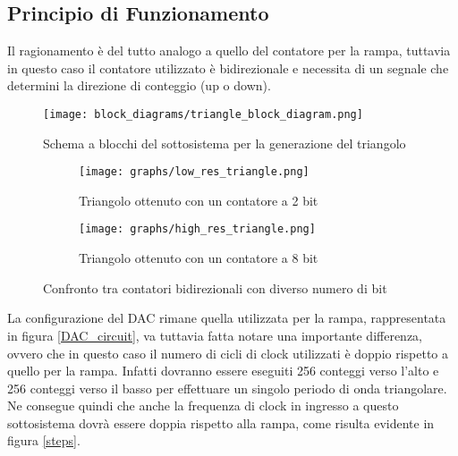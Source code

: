 
\subsection*{Principio di Funzionamento}


Il ragionamento è del tutto analogo a quello del contatore per la rampa, tuttavia in questo
caso il contatore utilizzato è bidirezionale e necessita di un segnale che determini la
direzione di conteggio (up o down).
\medskip

\begin{figure}[ht]
    \centering
    \texttt{[image: block\_diagrams/triangle\_block\_diagram.png]}
    \caption{Schema a blocchi del sottosistema per la generazione del triangolo}
    \label{triangle_block_diagram}
\end{figure}

\begin{figure}[ht]
    \centering

    \begin{subfigure}{.5\textwidth}
        \centering
        \texttt{[image: graphs/low\_res\_triangle.png]}
        \caption{Triangolo ottenuto con un contatore a 2 bit}
        \label{low_res_triangle}
    \end{subfigure}%
    \begin{subfigure}{.5\textwidth}
        \centering
        \texttt{[image: graphs/high\_res\_triangle.png]}
        \caption{Triangolo ottenuto con un contatore a 8 bit}
        \label{high_res_triangle}
    \end{subfigure}

    \caption{Confronto tra contatori bidirezionali con diverso numero di bit}
    \label{triangles}
\end{figure}

La configurazione del DAC rimane quella utilizzata per la rampa, rappresentata in figura
\ref{DAC_circuit}, va tuttavia fatta notare una importante differenza, ovvero che in questo
caso il numero di cicli di clock utilizzati è doppio rispetto a quello per la rampa. Infatti
dovranno essere eseguiti 256 conteggi verso l'alto e 256 conteggi verso il basso per effettuare
un singolo periodo di onda triangolare. Ne consegue quindi che anche la frequenza di clock
in ingresso a questo sottosistema dovrà essere doppia rispetto alla rampa, come risulta
evidente in figura \ref{steps}.
\medskip

